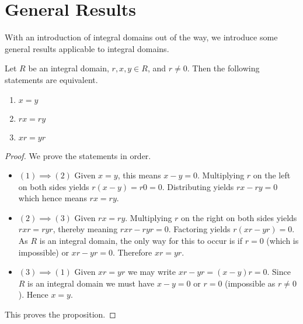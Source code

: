 \section{General Results}
With an introduction of integral domains out of the way, we introduce some general results applicable to integral domains.
\begin{proposition}
    Let $R$ be an integral domain, $r, x, y \in R$, and $r \neq 0$. Then the following statements are equivalent.
    \begin{enumerate}[label=(\arabic*)]
        \item $x = y$
        \item $rx = ry$
        \item $xr = yr$
    \end{enumerate}
\end{proposition}
\begin{proof}
    We prove the statements in order.
    \begin{itemize}
        \item $\boxed{(1) \implies (2)}$ Given $x = y$, this means $x - y = 0$. Multiplying $r$ on the left on both sides yields $r(x-y) = r0 = 0$. Distributing yields $rx - ry = 0$ which hence means $rx = ry$.
        
        \item $\boxed{(2) \implies (3)}$ Given $rx = ry$. Multiplying $r$ on the right on both sides yields $rxr = ryr$, thereby meaning $rxr - ryr = 0$. Factoring yields $r(xr - yr) = 0$. As $R$ is an integral domain, the only way for this to occur is if $r = 0$ (which is impossible) or $xr - yr = 0$. Therefore $xr = yr$.
        
        \item $\boxed{(3) \implies (1)}$ Given $xr = yr$ we may write $xr - yr = (x-y)r = 0$. Since $R$ is an integral domain we must have $x - y = 0$ or $r = 0$ (impossible as $r \neq 0$). Hence $x = y$.
    \end{itemize}
    This proves the proposition.
\end{proof}

\newpage

